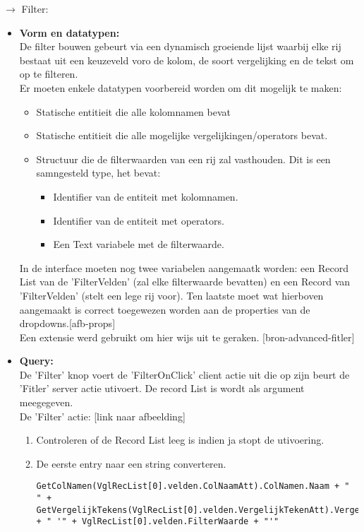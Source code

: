 $\rightarrow$ Filter:
\begin{itemize}
    \item \textbf{Vorm en datatypen:}\\
    De filter bouwen gebeurt via een dynamisch groeiende lijst waarbij elke rij bestaat uit een keuzeveld voro de kolom, de soort vergelijking en de tekst om op te filteren.\\
    Er moeten enkele datatypen voorbereid worden om dit mogelijk te maken:
    \begin{itemize}
        \item Statische entitieit die alle kolomnamen bevat
        \item Statische entitieit die alle mogelijke vergelijkingen/operators bevat.
        \item Structuur die de filterwaarden van een rij zal vasthouden. Dit is een samngesteld type, het bevat:
        \begin{itemize}
            \item Identifier van de entiteit met kolomnamen.
            \item Identifier van de entiteit met operators.
            \item Een Text variabele met de filterwaarde.
        \end{itemize}
    \end{itemize}
    In de interface moeten nog twee variabelen aangemaatk worden: een Record List van de 'FilterVelden' (zal elke filterwaarde bevatten) en een Record van 'FilterVelden' (stelt een lege rij voor). Ten laatste moet wat hierboven aangemaakt is correct toegewezen worden aan de properties van de dropdowns.[afb-props]\\
    Een extensie werd gebruikt om hier wijs uit te geraken. [bron-advanced-fitler]
    \item \textbf{Query:}\\
    De 'Filter' knop voert de 'FilterOnClick' client actie uit die op zijn beurt de 'Fitler' server actie utivoert. De record List is wordt als argument meegegeven.\\
    De 'Filter' actie: [link naar afbeelding]
    \begin{enumerate}
        \item Controleren of de Record List leeg is indien ja stopt de utivoering.
        \item De eerste entry naar een string converteren. 
\begin{lstlisting}
GetColNamen(VglRecList[0].velden.ColNaamAtt).ColNamen.Naam + " " + GetVergelijkTekens(VglRecList[0].velden.VergelijkTekenAtt).VergelijkTekens.Teken + " '" + VglRecList[0].velden.FilterWaarde + "'"

\end{lstlisting}
\end{enumerate}
\end{itemize}
